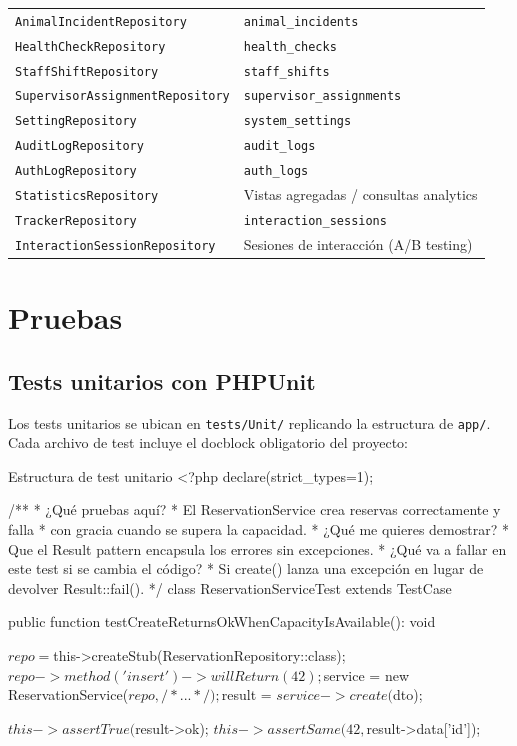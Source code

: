 \documentclass[12pt,a4paper,twoside,openright]{report}
\begin{document}
\begin{longtable}{@{}lp{7cm}@{}}
  \texttt{AnimalIncidentRepository}        & \texttt{animal\_incidents}\\
  \texttt{HealthCheckRepository}           & \texttt{health\_checks}\\
  \texttt{StaffShiftRepository}            & \texttt{staff\_shifts}\\
  \texttt{SupervisorAssignmentRepository}  & \texttt{supervisor\_assignments}\\
  \texttt{SettingRepository}               & \texttt{system\_settings}\\
  \texttt{AuditLogRepository}              & \texttt{audit\_logs}\\
  \texttt{AuthLogRepository}               & \texttt{auth\_logs}\\
  \texttt{StatisticsRepository}            & Vistas agregadas / consultas analytics\\
  \texttt{TrackerRepository}               & \texttt{interaction\_sessions}\\
  \texttt{InteractionSessionRepository}    & Sesiones de interacción (A/B testing)\\
\end{longtable}

\section{Pruebas}
\label{sec:pruebas}

\subsection{Tests unitarios con PHPUnit}

Los tests unitarios se ubican en \texttt{tests/Unit/} replicando la estructura de
\texttt{app/}. Cada archivo de test incluye el docblock obligatorio del proyecto:

\begin{phpcode}{Estructura de test unitario}
<?php declare(strict_types=1);

/**
 * ¿Qué pruebas aquí?
 *    El ReservationService crea reservas correctamente y falla
 *    con gracia cuando se supera la capacidad.
 * ¿Qué me quieres demostrar?
 *    Que el Result pattern encapsula los errores sin excepciones.
 * ¿Qué va a fallar en este test si se cambia el código?
 *    Si create() lanza una excepción en lugar de devolver Result::fail().
 */
class ReservationServiceTest extends TestCase
{
    public function testCreateReturnsOkWhenCapacityIsAvailable(): void
    {
        $repo = $this->createStub(ReservationRepository::class);
        $repo->method('insert')->willReturn(42);

        $service = new ReservationService($repo, /* ... */);
        $result  = $service->create($dto);

        $this->assertTrue($result->ok);
        $this->assertSame(42, $result->data['id']);
    }
}
\end{phpcode}
\end{document}
